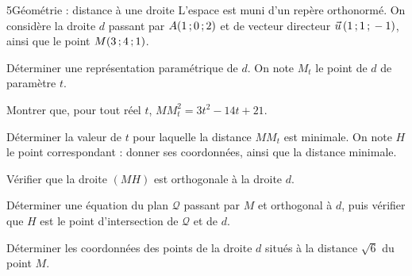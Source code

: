 \begin{exoBac}{5}{Géométrie : distance à une droite}
L'espace est muni d'un repère orthonormé. On considère la droite $d$ passant par $A(1\,{;}\,0\,{;}\,2)$ et de vecteur directeur
$\vec u\,(1\,{;}\,1\,{;}\,-1)$, ainsi que le point $M(3\,{;}\,4\,{;}\,1)$.
\begin{questions}
  \item Déterminer une représentation paramétrique de $d$. On note $M_t$ le point de $d$ de paramètre $t$.
  \item Montrer que, pour tout réel $t$, $MM_t^{2}=3t^{2}-14t+21$.
  \item Déterminer la valeur de $t$ pour laquelle la distance $MM_t$ est minimale. On note $H$ le point correspondant : donner ses
    coordonnées, ainsi que la distance minimale.
  \item Vérifier que la droite $(MH)$ est orthogonale à la droite $d$.
  \item Déterminer une équation du plan $\mathcal{Q}$ passant par $M$ et orthogonal à $d$, puis vérifier que $H$ est le point d'intersection
    de $\mathcal{Q}$ et de $d$.
  \item Déterminer les coordonnées des points de la droite $d$ situés à la distance $\sqrt6$ du point $M$.
\end{questions}
\end{exoBac}
